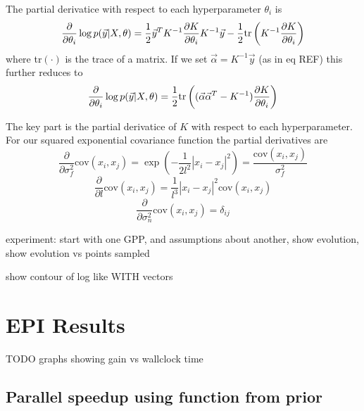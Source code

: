 \documentclass[phd,tocprelim]{cornell}
\begin{document}
The partial derivatice with respect to each hyperparameter $\theta_{i}$ is
\begin{equation}
    \frac{\partial}{\partial \theta_{i}} \log p(\vec{y}|X,\theta) = \frac{1}{2}\vec{y}^{T}K^{-1}\frac{\partial K}{\partial \theta_{i}} K^{-1}\vec{y} - \frac{1}{2} {\rm tr}\left( K^{-1}\frac{\partial K}{\partial \theta_{i}} \right)
\end{equation}
where tr$(\cdot)$ is the trace of a matrix. If we set $\vec{\alpha} = K^{-1}\vec{y}$ (as in eq REF) this further reduces to
\begin{equation}
    \frac{\partial}{\partial \theta_{i}} \log p(\vec{y}|X,\theta) = \frac{1}{2} {\rm tr}\left((\vec{\alpha}\vec{\alpha}^{T} - K^{-1})\frac{\partial K}{\partial \theta_{i}}\right)
\end{equation}

The key part is the partial derivatice of $K$ with respect to each hyperparameter. For our squared exponential covariance function the partial derivatives are
\begin{equation}
    \frac{\partial}{\partial \sigma_{f}^{2}} \mbox{cov}(x_{i}, x_{j}) = \exp\left( -\frac{1}{2l^{2}} |x_{i} - x_{j}|^{2}\right) = \frac{\mbox{cov}(x_{i}, x_{j})}{\sigma_{f}^{2}}
\end{equation}
\begin{equation}
    \frac{\partial}{\partial l} \mbox{cov}(x_{i}, x_{j}) = \frac{1}{l^{3}}|x_{i} - x_{j}|^{2}\mbox{cov}(x_{i}, x_{j})
\end{equation}
\begin{equation}
    \frac{\partial}{\partial \sigma_{n}^{2}} \mbox{cov}(x_{i}, x_{j}) = \delta_{ij}
\end{equation}

experiment: start with one GPP, and assumptions about another, show evolution, show evolution vs points sampled

show contour of log like WITH vectors



\chapter{EPI Results} %
\label{cha:EPI Results}


TODO graphs showing gain vs wallclock time

\section{Parallel speedup using function from prior}
\end{document}
